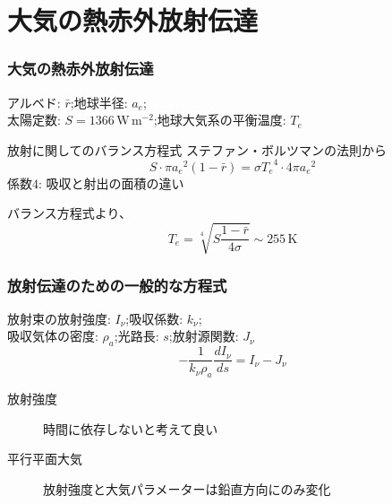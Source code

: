 \documentclass[unicode,colorlinks]{beamer}
\newcommand{\Unit}[1]{\,\mathrm{#1}}
\begin{document}
\section{大気の熱赤外放射伝達}

\begin{frame}
	\frametitle{大気の熱赤外放射伝達}
	アルベド: $\bar r$;\quad 地球半径: $a_e$;\quad\\
	太陽定数: $S=1366\Unit{W\,m^{-2}}$;\quad 地球大気系の平衡温度: $T_e$
	\begin{block}{放射に関してのバランス方程式}
		ステファン・ボルツマンの法則から
		\[S\cdot\pi{a_e}^2(1-\bar r)=\sigma{T_e}^4\cdot4\pi{a_e}^2\]
		係数$4$: 吸収と射出の面積の違い

		バランス方程式より、
		\[T_e=\sqrt[4]{S\frac{1-\bar r}{4\sigma}}\sim255\Unit{K}\]
	\end{block}
\end{frame}

\begin{frame}
	\frametitle{放射伝達のための一般的な方程式}
	放射束の放射強度: $I_\nu$;\quad 吸収係数: $k_\nu$;\\
	吸収気体の密度: $\rho_a$;\quad 光路長: $s$;\quad 放射源関数: $J_\nu$
	\[-\frac{1}{k_\nu \rho_a}\frac{dI_\nu}{ds}=I_\nu-J_\nu\]

	\begin{description}
		\item[放射強度] 時間に依存しないと考えて良い
		\item[平行平面大気] 放射強度と大気パラメーターは鉛直方向にのみ変化
	\end{description}
\end{frame}
\end{document}
